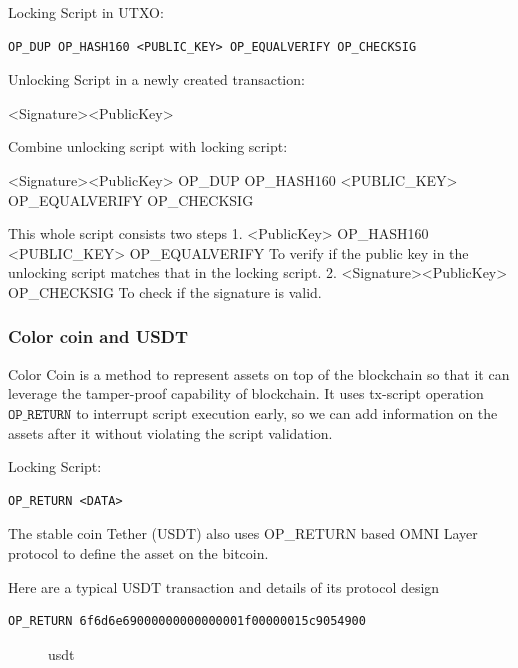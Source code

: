 \documentclass[a4paper,11pt]{article}
\begin{document}
Locking Script in UTXO:

\begin{lstlisting}
OP_DUP OP_HASH160 <PUBLIC_KEY> OP_EQUALVERIFY OP_CHECKSIG
\end{lstlisting}

Unlocking Script in a newly created transaction:

<Signature><PublicKey>

Combine unlocking script with locking script:

<Signature><PublicKey> OP\_DUP OP\_HASH160 <PUBLIC\_KEY> OP\_EQUALVERIFY OP\_CHECKSIG

This whole script consists two steps
1. <PublicKey>  OP\_HASH160 <PUBLIC\_KEY> OP\_EQUALVERIFY
	To verify if the public key in the unlocking script matches that in the locking script.
2.  <Signature><PublicKey> OP\_CHECKSIG
	To check if the signature is valid.


\subsubsection{Color coin and USDT}

Color Coin is a method to represent assets on top of the blockchain so that it can leverage the tamper-proof capability of blockchain. It uses tx-script operation $\texttt{OP\_RETURN}$ to interrupt script execution early, so we can add information on the assets after it without violating the script validation.

Locking Script:
\begin{lstlisting}
OP_RETURN <DATA>
\end{lstlisting}

The stable coin Tether (USDT) also uses OP\_RETURN based OMNI Layer protocol to define the asset on the bitcoin. 

Here are a typical USDT transaction and details of its protocol design


\lstset{basicstyle=\tiny,style=myListStyle}
\begin{lstlisting}
OP_RETURN 6f6d6e69000000000000001f00000015c9054900
\end{lstlisting}


\begin{figure}[hbt]
	\centerline{%
	}
\caption{usdt}
\end{figure}
\end{document}
